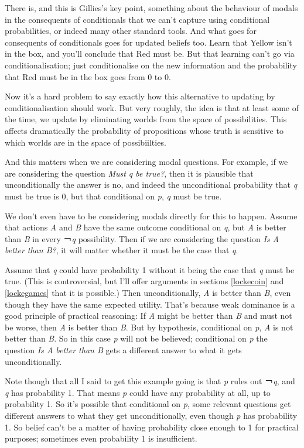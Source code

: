 \documentclass[
  11pt,
]{book}
\begin{document}
There is, and this is Gillies's key point, something about the behaviour of modals in the consequents of conditionals that we can't capture using conditional probabilities, or indeed many other standard tools. And what goes for consequents of conditionals goes for updated beliefs too. Learn that Yellow isn't in the box, and you'll conclude that Red must be. But that learning can't go via conditionalisation; just conditionalise on the new information and the probability that Red must be in the box goes from 0 to 0.

Now it's a hard problem to say exactly how this alternative to updating by conditionalisation should work. But very roughly, the idea is that at least some of the time, we update by eliminating worlds from the space of possibilities. This affects dramatically the probability of propositions whose truth is sensitive to which worlds are in the space of possibiilties.

And this matters when we are considering modal questions. For example, if we are considering the question \emph{Must q be true?}, then it is plausible that unconditionally the answer is no, and indeed the unconditional probability that \emph{q} must be true is 0, but that conditional on \emph{p}, \emph{q} must be true.

We don't even have to be considering modals directly for this to happen. Assume that actions \emph{A} and \emph{B} have the same outcome conditional on \emph{q}, but \emph{A} is better than \emph{B} in every ￢\emph{q} possibility. Then if we are considering the question \emph{Is A better than B?}, it will matter whether it must be the case that \emph{q}.

Assume that \emph{q} could have probability 1 without it being the case that \emph{q} must be true. (This is controversial, but I'll offer arguments in sections \ref{lockecoin} and \ref{lockegames} that it is possible.) Then unconditionally, \emph{A} is better than \emph{B}, even though they have the same expected utility. That's because weak dominance is a good principle of practical reasoning: If \emph{A} might be better than \emph{B} and must not be worse, then \emph{A} is better than \emph{B}. But by hypothesis, conditional on \emph{p}, \emph{A} is not better than \emph{B}. So in this case \emph{p} will not be believed; conditional on \emph{p} the question \emph{Is A better than B} gets a different answer to what it gets unconditionally.

Note though that all I said to get this example going is that \emph{p} rules out ￢\emph{q}, and \emph{q} has probability 1. That means \emph{p} could have any probability at all, up to probability 1. So it's possible that conditional on \emph{p}, some relevant questions get different answers to what they get unconditionally, even though \emph{p} has probability 1. So belief can't be a matter of having probability close enough to 1 for practical purposes; sometimes even probability 1 is insufficient.
\end{document}
